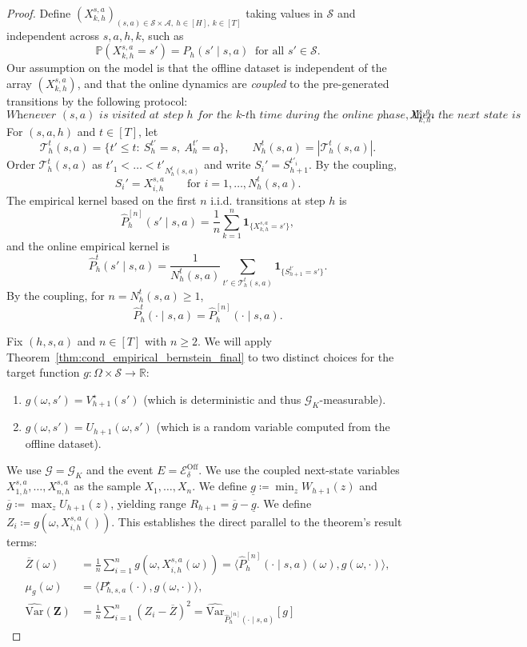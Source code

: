 \documentclass[10pt,a4paper]{amsart}
\newcommand{\highv}{U} %
\newcommand{\lowv}{W} %
\begin{document}
\begin{proof}
Define $(X_{k,h}^{s,a})_{(s,a)\in\mathcal S\times\mathcal A,\ h\in[H],\ k\in[T]}$ taking values in $\mathcal S$ and independent across $s,a,h,k$, such as
  \[
  \mathbb{P}(X_{k,h}^{s,a}=s')=P_h(s'\mid s,a)\ \text{ for all }s'\in\mathcal S.
  \]
Our assumption on the model is that the offline dataset is independent of the array $(X_{k,h}^{s,a})$, and that the online dynamics are \emph{coupled} to the pre-generated transitions by the following protocol:
\[
\textit{Whenever $(s,a)$ is visited at step $h$ for the $k$-th time during the online phase, then the next state is } X_{k,h}^{s,a}.
\]
For $(s,a,h)$ and $t\in[T]$, let
\[
\mathcal T_h^t(s,a)=\{t'\le t:\ S_h^{t'}=s,\ A_h^{t'}=a\},\qquad
N_h^t(s,a)=|\mathcal T_h^t(s,a)|.
\]
Order $\mathcal T_h^t(s,a)$ as $t'_1<\dots<t'_{N_h^t(s,a)}$ and write $S_i'=S_{h+1}^{t'_i}$. By the coupling,
\[
S_i'=X_{i,h}^{s,a}\qquad\text{for }i=1,\dots,N_h^t(s,a).
\]
The empirical kernel based on the first $n$ i.i.d. transitions at step $h$ is
\[
\widehat P_h^{[n]}(s'\mid s,a)=\frac1n\sum_{k=1}^n\mathbf 1_{\{X_{k,h}^{s,a}=s'\}},
\]
and the online empirical kernel is
\[
\widehat P_h^{t}(s'\mid s,a)=\frac{1}{N_h^t(s,a)}\sum_{t'\in\mathcal T_h^t(s,a)}\mathbf 1_{\{S_{h+1}^{t'}=s'\}}.
\]
By the coupling, for $n=N_h^t(s,a)\ge1$,
\[
\widehat P_h^{t}(\cdot\mid s,a)=\widehat P_h^{[n]}(\cdot\mid s,a).
\]

Fix $(h,s,a)$ and $n \in [T]$ with $n \ge 2$. We will apply  Theorem~\ref{thm:cond_empirical_bernstein_final} to two distinct choices for the target function $g: \Omega \times \mathcal{S} \to \mathbb{R}$:
\begin{enumerate}
    \item $g(\omega, s') = V_{h+1}^\star(s')$ (which is deterministic and thus $\mathcal{G}_K$-measurable).
    \item $g(\omega, s') = \highv_{h+1}(\omega, s')$ (which is a random variable computed from the offline dataset).
\end{enumerate}
We use $\mathcal{G} = \mathcal{G}_K$ and the event $E = \mathcal{E}^{\mathrm{Off}}_\delta$.
We use the coupled next-state variables $X_{1,h}^{s,a}, \dots, X_{n,h}^{s,a}$ as the sample $X_1, \dots, X_n$.
We define $\underline{g} \coloneqq \min_{z} \lowv_{h+1}(z)$ and $\overline{g} \coloneqq \max_{z} \highv_{h+1}(z)$, yielding range $R_{h+1} = \overline{g} - \underline{g}$.
We define $Z_i \coloneqq g(\omega, X_{i,h}^{s,a}())$. This establishes the direct parallel to the theorem's result terms:
    \begin{align*}
        \overline{Z}(\omega) &= \frac{1}{n}\sum_{i=1}^n g(\omega, X_{i,h}^{s,a}(\omega)) = \langle \widehat{P}_h^{[n]}(\cdot\mid s,a)(\omega), g(\omega,\cdot) \rangle, \\
        \mu_g(\omega) &= \langle P_{h,s,a}^\star(\cdot), g(\omega,\cdot) \rangle, \\
        \widehat{\mathrm{Var}}(\mathbf{Z}) &= \frac{1}{n}\sum_{i=1}^n (Z_i - \overline{Z})^2 = \widehat{\mathrm{Var}}_{\widehat{P}_h^{[n]}(\cdot\mid s,a)}[g]
    \end{align*}


\end{proof}
\end{document}
